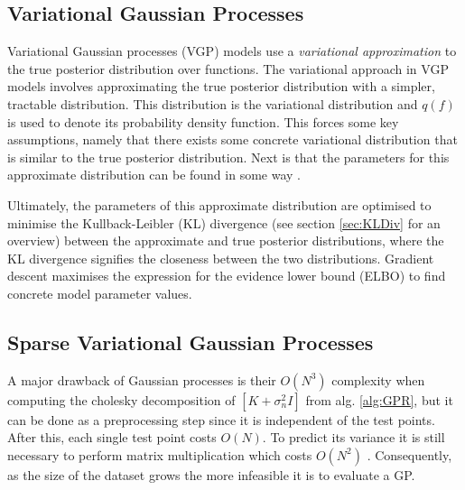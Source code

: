 \documentclass[12pt,a4paper]{report}
\theoremstyle{definition}
\begin{document}

\subsection{Variational Gaussian Processes}

Variational Gaussian processes (VGP) models use a \emph{variational approximation} to the true posterior distribution over functions.
The variational approach in VGP models involves approximating the true posterior distribution with a simpler, tractable distribution. 
This distribution is the variational distribution and $q(f)$ is used to denote its probability density function.
This forces some key assumptions, namely that there exists some concrete variational distribution that is similar to the true posterior distribution. 
Next is that the parameters for this approximate distribution can be found in some way \citep{Yi2020}.

Ultimately, the parameters of this approximate distribution are optimised to minimise the Kullback-Leibler (KL) divergence (see section \ref{sec:KLDiv} for an overview) between the approximate and true posterior distributions, where the KL divergence signifies the closeness between the two distributions.
Gradient descent maximises the expression for the evidence lower bound (ELBO) to find concrete model parameter values.

\subsection{Sparse Variational Gaussian Processes}

A major drawback of Gaussian processes is their $O(N^3)$ complexity when computing the cholesky decomposition of $[K + \sigma_{n}^2I]$ from alg. \ref{alg:GPR}, but it can be done as a preprocessing step since it is independent of the test points. 
After this, each single test point costs $O(N)$. 
To predict its variance it is still necessary to perform matrix multiplication which costs $O(N^2)$ \citep{Kaiser2018}.
Consequently, as the size of the dataset grows the more infeasible it is to evaluate a GP.
\end{document}
